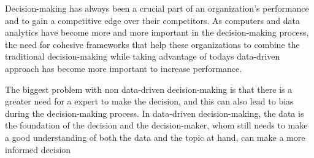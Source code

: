 




Decision-making has always been a crucial part of an organization's performance and to gain 
a competitive edge over their competitors. As computers and data analytics have become more 
and more important in the decision-making process, the need for cohesive frameworks that 
help these organizations to combine the traditional decision-making while taking advantage of 
todays data-driven approach has become more important to increase performance. 

The biggest problem with non data-driven decision-making is that there is a greater need for 
a expert to make the decision, and this can also lead to bias during the decision-making process. 
In data-driven decision-making, the data is the foundation of the decision and the decision-maker, 
whom still needs to make a good understanding of both the data and the topic at hand, can make
a more informed decision \cite{DECAS}

